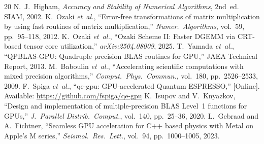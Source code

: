 \documentclass[conference]{IEEEtran}
\begin{document}
\begin{thebibliography}{20}
N.~J.~Higham, \emph{Accuracy and Stability of Numerical Algorithms}, 2nd~ed. SIAM, 2002.
K.~Ozaki \emph{et~al.}, ``Error-free transformations of matrix multiplication by using fast routines of matrix multiplication,'' \emph{Numer.\ Algorithms}, vol.~59, pp.~95--118, 2012.
K.~Ozaki \emph{et~al.}, ``Ozaki Scheme II: Faster DGEMM via CRT-based tensor core utilization,'' \emph{arXiv:2504.08009}, 2025.
T.~Yamada \emph{et~al.}, ``QPBLAS-GPU: Quadruple precision BLAS routines for GPU,'' JAEA Technical Report, 2013.
M.~Baboulin \emph{et~al.}, ``Accelerating scientific computations with mixed precision algorithms,'' \emph{Comput.\ Phys.\ Commun.}, vol.~180, pp.~2526--2533, 2009.
F.~Spiga \emph{et~al.}, ``qe-gpu: GPU-accelerated Quantum ESPRESSO,'' [Online]. Available: \url{https://github.com/fspiga/qe-gpu}
K.~Isupov and V.~Knyazkov, ``Design and implementation of multiple-precision BLAS Level~1 functions for GPUs,'' \emph{J.~Parallel Distrib.\ Comput.}, vol.~140, pp.~25--36, 2020.
L.~Gebraad and A.~Fichtner, ``Seamless GPU acceleration for C++ based physics with Metal on Apple's M series,'' \emph{Seismol.\ Res.\ Lett.}, vol.~94, pp.~1000--1005, 2023.
\end{thebibliography}
\end{document}
